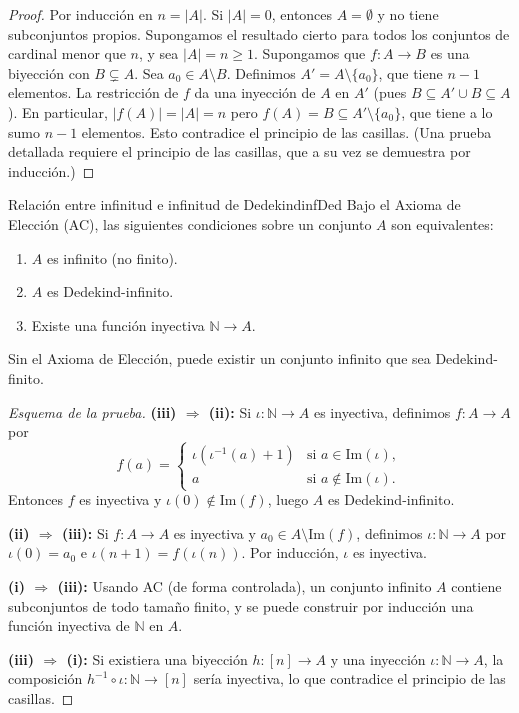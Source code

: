 \begin{proof}
Por inducción en $n = |A|$. Si $|A| = 0$, entonces $A = \emptyset$ y no tiene subconjuntos propios. Supongamos el resultado cierto para todos los conjuntos de cardinal menor que $n$, y sea $|A| = n \geq 1$. Supongamos que $f: A \to B$ es una biyección con $B \subsetneq A$. Sea $a_0 \in A \setminus B$. Definimos $A' = A \setminus \{a_0\}$, que tiene $n-1$ elementos. La restricción de $f$ da una inyección de $A$ en $A'$ (pues $B \subseteq A' \cup B \subseteq A$). En particular, $|f(A)| = |A| = n$ pero $f(A) = B \subseteq A' \setminus \{a_0\}$, que tiene a lo sumo $n-1$ elementos. Esto contradice el principio de las casillas. (Una prueba detallada requiere el principio de las casillas, que a su vez se demuestra por inducción.)
\end{proof}

\begin{proposicion}{Relación entre infinitud e infinitud de Dedekind}{infDed}
Bajo el Axioma de Elección (AC), las siguientes condiciones sobre un conjunto $A$ son equivalentes:
\begin{enumerate}[leftmargin=2em, label=(\roman*)]
  \item $A$ es infinito (no finito).
  \item $A$ es Dedekind-infinito.
  \item Existe una función inyectiva $\mathbb{N} \to A$.
\end{enumerate}
Sin el Axioma de Elección, puede existir un conjunto infinito que sea Dedekind-finito. \cite{herrlich2006}
\end{proposicion}

\begin{proof}[Esquema de la prueba]
\textbf{(iii) $\Rightarrow$ (ii):} Si $\iota: \mathbb{N} \to A$ es inyectiva, definimos $f: A \to A$ por
\[
  f(a) = \begin{cases} \iota(\iota^{-1}(a) + 1) & \text{si } a \in \mathrm{Im}(\iota), \\ a & \text{si } a \notin \mathrm{Im}(\iota). \end{cases}
\]
Entonces $f$ es inyectiva y $\iota(0) \notin \mathrm{Im}(f)$, luego $A$ es Dedekind-infinito.

\textbf{(ii) $\Rightarrow$ (iii):} Si $f: A \to A$ es inyectiva y $a_0 \in A \setminus \mathrm{Im}(f)$, definimos $\iota: \mathbb{N} \to A$ por $\iota(0) = a_0$ e $\iota(n+1) = f(\iota(n))$. Por inducción, $\iota$ es inyectiva.

\textbf{(i) $\Rightarrow$ (iii):} Usando AC (de forma controlada), un conjunto infinito $A$ contiene subconjuntos de todo tamaño finito, y se puede construir por inducción una función inyectiva de $\mathbb{N}$ en $A$.

\textbf{(iii) $\Rightarrow$ (i):} Si existiera una biyección $h: [n] \to A$ y una inyección $\iota: \mathbb{N} \to A$, la composición $h^{-1} \circ \iota: \mathbb{N} \to [n]$ sería inyectiva, lo que contradice el principio de las casillas.
\end{proof}

